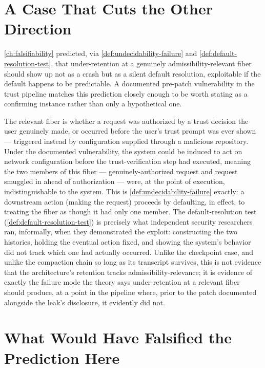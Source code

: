 \documentclass[11pt]{book}
\theoremstyle{plain}
\theoremstyle{definition}
\theoremstyle{remark}
\begin{document}
\section{A Case That Cuts the Other Direction}
\label{sec:cve-case}

\cref{ch:falsifiability} predicted, via
\cref{def:undecidability-failure} and
\cref{def:default-resolution-test}, that under-retention at a
genuinely admissibility-relevant fiber should show up not as a crash
but as a silent default resolution, exploitable if the default happens
to be predictable. A documented pre-patch vulnerability in the trust
pipeline matches this prediction closely enough to be worth stating as
a confirming instance rather than only a hypothetical one.

The relevant fiber is whether a request was authorized by a trust
decision the user genuinely made, or occurred before the user's trust
prompt was ever shown --- triggered instead by configuration supplied
through a malicious repository. Under the documented vulnerability,
the system could be induced to act on network configuration before the
trust-verification step had executed, meaning the two members of this
fiber --- genuinely-authorized request and request smuggled in ahead
of authorization --- were, at the point of execution, indistinguishable
to the system. This is \cref{def:undecidability-failure} exactly: a
downstream action (making the request) proceeds by defaulting, in
effect, to treating the fiber as though it had only one member. The
default-resolution test (\cref{def:default-resolution-test}) is
precisely what independent security researchers ran, informally, when
they demonstrated the exploit: constructing the two histories, holding
the eventual action fixed, and showing the system's behavior did not
track which one had actually occurred. Unlike the checkpoint case, and
unlike the compaction chain so long as its transcript survives, this
is not evidence that the architecture's retention tracks
admissibility-relevance; it is evidence of exactly
the failure mode the theory says under-retention at a relevant fiber
should produce, at a point in the pipeline where, prior to the patch
documented alongside the leak's disclosure, it evidently did not.

\section{What Would Have Falsified the Prediction Here}
\label{sec:leak-audit-falsification}
\end{document}
